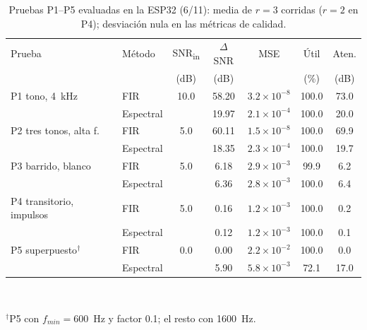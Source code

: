 \begin{table}[!t]
\centering
\caption{Pruebas P1--P5 evaluadas en la ESP32 (6/11): media de $r=3$ corridas ($r=2$ en P4); desviación nula en las métricas de calidad.}
\label{tab:pruebas}
\setlength{\tabcolsep}{2.5pt}\footnotesize
\begin{tabular}{llccccc}
\toprule
Prueba & Método & SNR\textsubscript{in} & $\Delta$SNR & MSE & Útil & Aten. \\
 & & (dB) & (dB) & & (\%) & (dB) \\
\midrule
P1 tono, 4~kHz & FIR & 10.0 & 58.20 & $3.2\times10^{-8}$ & 100.0 & 73.0 \\
 & Espectral & & 19.97 & $2.1\times10^{-4}$ & 100.0 & 20.0 \\
P2 tres tonos, alta f. & FIR & 5.0 & 60.11 & $1.5\times10^{-8}$ & 100.0 & 69.9 \\
 & Espectral & & 18.35 & $2.3\times10^{-4}$ & 100.0 & 19.7 \\
P3 barrido, blanco & FIR & 5.0 & 6.18 & $2.9\times10^{-3}$ & 99.9 & 6.2 \\
 & Espectral & & 6.36 & $2.8\times10^{-3}$ & 100.0 & 6.4 \\
P4 transitorio, impulsos & FIR & 5.0 & 0.16 & $1.2\times10^{-3}$ & 100.0 & 0.2 \\
 & Espectral & & 0.12 & $1.2\times10^{-3}$ & 100.0 & 0.1 \\
P5 superpuesto$^\dagger$ & FIR & 0.0 & 0.00 & $2.2\times10^{-2}$ & 100.0 & 0.0 \\
 & Espectral & & 5.90 & $5.8\times10^{-3}$ & 72.1 & 17.0 \\
\bottomrule
\end{tabular}\\[2pt]
\raggedright\footnotesize $^\dagger$P5 con $f_{min}=600$~Hz y factor 0.1; el resto con 1600~Hz.
\end{table}
